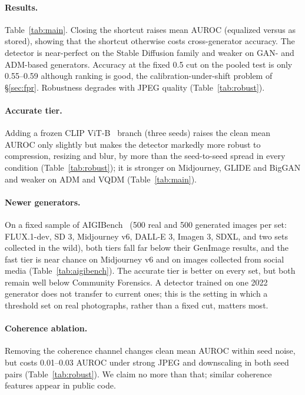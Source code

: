 \documentclass[10pt,twocolumn]{article}
\begin{document}


\paragraph{Results.} Table~\ref{tab:main}. Closing the shortcut raises mean
AUROC (equalized versus as stored), showing that the shortcut otherwise costs
cross-generator accuracy. The detector is near-perfect on the Stable
Diffusion family and weaker on GAN- and ADM-based generators. Accuracy at the
fixed 0.5 cut on the pooled test is only 0.55--0.59 although ranking is good,
the calibration-under-shift problem of \S\ref{sec:fpr}. Robustness degrades
with JPEG quality (Table~\ref{tab:robust}).

\paragraph{Accurate tier.} Adding a frozen CLIP ViT-B~\cite{radford2021clip}
branch (three seeds) raises the clean mean AUROC only slightly but makes the
detector markedly more robust to compression, resizing and blur, by more
than the seed-to-seed spread in every condition (Table~\ref{tab:robust}); it
is stronger on Midjourney, GLIDE and BigGAN and weaker on ADM and VQDM
(Table~\ref{tab:main}).

\paragraph{Newer generators.} On a fixed sample of AIGIBench~\cite{li2025aigibench}
(500 real and 500 generated images per set: FLUX.1-dev, SD 3, Midjourney v6,
DALL-E 3, Imagen 3, SDXL, and two sets collected in the wild), both tiers
fall far below their GenImage results, and the fast tier is near chance on
Midjourney v6 and on images collected from social media
(Table~\ref{tab:aigibench}). The accurate tier is better on every set, but
both remain well below Community Forensics. A detector trained on one 2022
generator does not transfer to current ones; this is the setting in which a
threshold set on real photographs, rather than a fixed cut, matters most.



\paragraph{Coherence ablation.} Removing the coherence channel changes clean
mean AUROC within seed noise, but costs 0.01--0.03 AUROC under strong JPEG
and downscaling in both seed pairs (Table~\ref{tab:robust}). We claim no more
than that; similar coherence features appear in public code.
\end{document}
